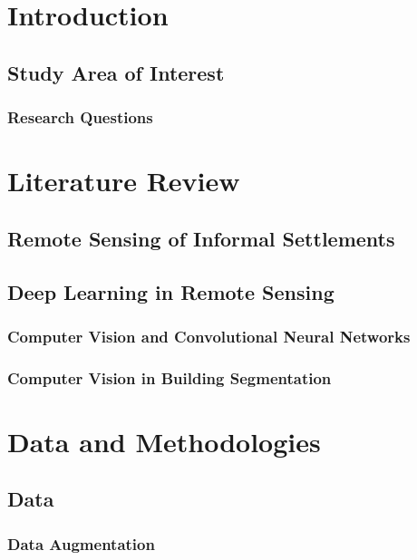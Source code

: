 \documentclass[11pt, a4paper, twoside]{report}
\begin{document}
\newpage

\chapter{Introduction}\label{Intro}
\section{Study Area of Interest}\label{StudyAOI}
\subsection{Research Questions}\label{RQ}

\newpage

\chapter{Literature Review}\label{LitReview}
\section{Remote Sensing of Informal Settlements}\label{RSofInformalSettlement}
\section{Deep Learning in Remote Sensing}\label{DLinRS}
\subsection{Computer Vision and Convolutional Neural Networks}\label{CVandCNN}
\subsection{Computer Vision in Building Segmentation}\label{CVinBS}

\newpage

\chapter{Data and Methodologies}\label{DataandMethods}
\section{Data}\label{Data}
\subsection{Data Augmentation}\label{DataAug}
\end{document}
